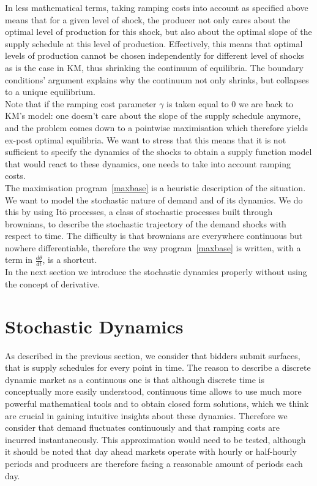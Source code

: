In less mathematical terms, taking ramping costs into account as specified above means that for a given level of shock, the producer not only cares about the optimal level of production for this shock, but also about the optimal slope of the supply schedule at this level of production. Effectively, this means that optimal levels of production cannot be chosen independently for different level of shocks as is the case in KM, thus shrinking the continuum of equilibria. The boundary conditions' argument explains why the continuum not only shrinks, but collapses to a unique equilibrium. \\

Note that if the ramping cost parameter $\gamma$ is taken equal to $0$ we are back to KM's model: one doesn't care about the slope of the supply schedule anymore, and the problem comes down to a pointwise maximisation which therefore yields ex-post optimal equilibria. We want to stress that this means that it is not sufficient to specify the dynamics of the shocks to obtain a supply function model that would react to these dynamics, one needs to take into account ramping costs.\\

The maximisation program~\ref{maxbase} is a heuristic description of the situation. We want to model the stochastic nature of demand and of its dynamics. We do this by using It\={o} processes, a class of stochastic processes built through brownians, to describe the stochastic trajectory of the demand shocks with respect to time. The difficulty is that brownians are everywhere continuous but nowhere differentiable, therefore the way program~\ref{maxbase} is written, with a term in $\frac{d\theta}{dt}$, is a shortcut.\\

In the next section we introduce the stochastic dynamics properly without using the concept of derivative. 


\section{Stochastic Dynamics}\label{math}

As described in the previous section, we consider that bidders submit surfaces, that is supply schedules for every point in time. The reason to describe a discrete dynamic market as a continuous one is that although discrete time is conceptually more easily understood, continuous time allows to use much more powerful mathematical tools and to obtain closed form solutions, which we think are crucial in gaining intuitive insights about these dynamics. Therefore we consider that demand fluctuates continuously and that ramping costs are incurred instantaneously. This approximation would need to be tested, although it should be noted that day ahead markets operate with hourly or half-hourly periods and producers are therefore facing a reasonable amount of periods each day. \\ 

